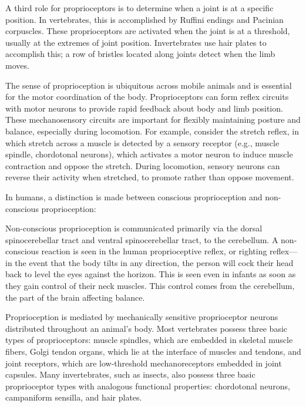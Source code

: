 A third role for proprioceptors is to determine when a joint is at a specific position. In vertebrates, this is accomplished by Ruffini endings and Pacinian corpuscles. These proprioceptors are activated when the joint is at a threshold, usually at the extremes of joint position. Invertebrates use hair plates to accomplish this; a row of bristles located along joints detect when the limb moves.

The sense of proprioception is ubiquitous across mobile animals and is essential for the motor coordination of the body. Proprioceptors can form reflex circuits with motor neurons to provide rapid feedback about body and limb position. These mechanosensory circuits are important for flexibly maintaining posture and balance, especially during locomotion. For example, consider the stretch reflex, in which stretch across a muscle is detected by a sensory receptor (e.g., muscle spindle, chordotonal neurons), which activates a motor neuron to induce muscle contraction and oppose the stretch. During locomotion, sensory neurons can reverse their activity when stretched, to promote rather than oppose movement.

In humans, a distinction is made between conscious proprioception and non-conscious proprioception:

Non-conscious proprioception is communicated primarily via the dorsal spinocerebellar tract and ventral spinocerebellar tract, to the cerebellum. A non-conscious reaction is seen in the human proprioceptive reflex, or righting reflex---in the event that the body tilts in any direction, the person will cock their head back to level the eyes against the horizon. This is seen even in infants as soon as they gain control of their neck muscles. This control comes from the cerebellum, the part of the brain affecting balance.

Proprioception is mediated by mechanically sensitive proprioceptor neurons distributed throughout an animal's body. Most vertebrates possess three basic types of proprioceptors: muscle spindles, which are embedded in skeletal muscle fibers, Golgi tendon organs, which lie at the interface of muscles and tendons, and joint receptors, which are low-threshold mechanoreceptors embedded in joint capsules. Many invertebrates, such as insects, also possess three basic proprioceptor types with analogous functional properties: chordotonal neurons, campaniform sensilla, and hair plates.

